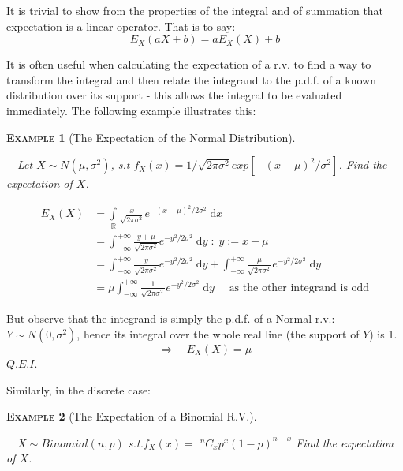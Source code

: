 \documentclass[12pt,a4paper]{article}
\newtheorem{example}{\textsc{Example}}[section]
\begin{document}
It is trivial to show from the properties of the integral and of summation that expectation is a linear operator. That is to say:
$$E_{X}(aX + b) = aE_{X}(X) + b$$

It is often useful when calculating the expectation of a r.v. to find a way to transform the integral and then relate the integrand to the p.d.f. of a known distribution over its support - this allows the integral to be evaluated immediately. The following example illustrates this:

\begin{example}[The Expectation of the Normal Distribution]$\;$\par
\vspace{1cm}

$\quad$Let $X \sim N(\mu, \sigma^2)$, s.t $f_X(x) = 1/\sqrt{2 \pi \sigma^2} exp[-(x - \mu)^2/\sigma^2]$. Find the expectation of $X$.
\end{example}

\begin{align*}
E_{X}(X) &= \int\limits_{\mathbb{R}}\!\! \frac{x}{\sqrt{2 \pi \sigma^2}} e^{-(x - \mu)^2/2\sigma^2}\;\mathrm{d}x\\
&= \int_{-\infty}^{+\infty}\!\!\frac{y + \mu}{\sqrt{2 \pi \sigma^2}}e^{-y^2/2\sigma^2}\;\mathrm{d}y \; : \; y := x - \mu \\
&= \int_{-\infty}^{+\infty}\!\! \frac{y}{\sqrt{2 \pi \sigma^2}}e^{-y^2/2\sigma^2}\;\mathrm{d}y + \int_{-\infty}^{+\infty} \!\!\frac{\mu}{\sqrt{2 \pi \sigma^2}}e^{-y^2/2\sigma^2}\;\mathrm{d}y \\
&= \mu \int_{-\infty}^{+\infty} \!\!\frac{1}{\sqrt{2 \pi \sigma^2}}e^{-y^2/2\sigma^2}\;\mathrm{d}y\quad \text{ as the other integrand is odd}
\end{align*}

But observe that the integrand is simply the p.d.f. of a Normal r.v.: $Y \sim N(0,\sigma^2)$, hence its integral over the whole real line (the support of $Y$) is 1.
$$\Rightarrow \quad E_{X}(X) = \mu$$
\hfill $Q.E.I.$

\noindent Similarly, in the discrete case:

\begin{example}[The Expectation of a Binomial R.V.]$\;$\par
\vspace{1cm}

$\quad X \sim Binomial(n, p)$ s.t.$f_X(x) =$ $^nC_x p^x (1 - p)^{n - x}$ Find the expectation of $X$.
\end{example}
\end{document}

